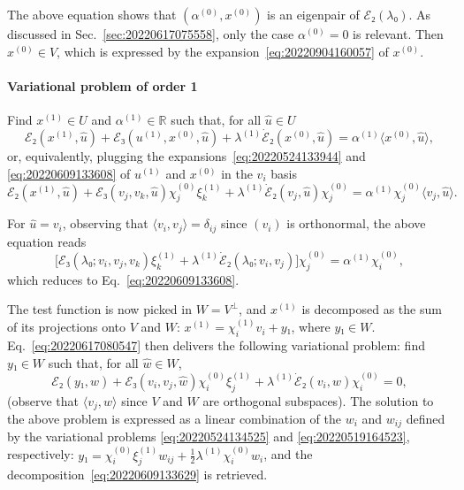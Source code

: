 \documentclass[12pt, final]{scrartcl}
\theoremstyle{definition}
\newcommand{\order}[2][1]{#2^{(#1)}}
\newcommand{\reals}{\mathbb{R}}
\begin{document}
The above equation shows that \((\order[0]α, \order[0]x)\) is an eigenpair of \(ℰ₂(λ₀)\). As
discussed in Sec.~\ref{sec:20220617075558}, only the case \(\order[0]α = 0\) is
relevant. Then \(\order[0]x ∈ V\), which is expressed by the
expansion~\eqref{eq:20220904160057} of \(\order[0]x\).

\paragraph{Variational problem of order 1} Find \(\order[1]x∈U\) and \(\order[1]α∈\reals\) such
that, for all \(\hat{u}∈U\)
\begin{equation}
  \label{eq:20220609131953}
  ℰ₂(\order[1]x, \hat{u}) + ℰ₃(\order[1]u, \order[0]x, \hat{u}) + \order[1]λ \dot{ℰ}₂(\order[0]x, \hat{u}) = \order[1]α 〈 \order[0]x, \hat{u} 〉,
\end{equation}
or, equivalently, plugging the expansions~\eqref{eq:20220524133944} and
\eqref{eq:20220609133608} of \(\order[1]u\) and \(\order[0]x\) in the \(v_i\) basis
\begin{equation}
  \label{eq:20220617080547}
  ℰ₂(\order[1]x, \hat{u}) + ℰ₃(v_j, v_k, \hat{u}) \order[0]{χ_j} \order[1]{ξ_k} + \order[1]λ \dot{ℰ}₂(v_j, \hat{u}) \order[0]{χ_j} = \order[1]α \order[0]{χ_j} 〈 v_j, \hat{u} 〉.
\end{equation}

For \(\hat{u} = v_i\), observing that \(〈 v_i, v_j 〉 = δ_{ij}\) since
\((v_i)\) is orthonormal, the above equation reads
\begin{equation}
  \bigl[ℰ₃(λ₀; v_i, v_j, v_k) \order[1]{ξ_k} + \order[1]λ \dot{ℰ}₂(λ₀; v_i, v_j)\bigr] \order[0]{χ_j} = \order[1]α \order[0]{χ_i},
\end{equation}
which reduces to Eq.~\eqref{eq:20220609133608}.

The test function is now picked in \(W = V^\perp\), and \(\order[1]x\) is decomposed as
the sum of its projections onto \(V\) and \(W\): \(\order[1]x = \order[1]{χ_i} v_i + y₁\), where
\(y₁ ∈ W\). Eq.~\eqref{eq:20220617080547} then delivers the following
variational problem: find \(y₁ ∈ W\) such that, for all \(\hat{w} ∈ W\),
\begin{equation}
  ℰ₂(y₁, \hat{w}) + ℰ₃(v_i, v_j, \hat{w}) \order[0]{χ_i} \order[1]{ξ_j} + \order[1]λ \dot{ℰ}₂(v_i, \hat{w}) \order[0]{χ_i} = 0,
\end{equation}
(observe that \(〈 v_j, \hat{w} 〉\) since \(V\) and \(W\) are orthogonal
subspaces). The solution to the above problem is expressed as a linear
combination of the \(w_i\) and \(w_{ij}\) defined by the variational problems
\eqref{eq:20220524134525} and \eqref{eq:20220519164523}, respectively:
\(y₁ = \order[0]{χ_i} \order[1]{ξ_j} w_{i j} + \tfrac{1}{2} \order[1]λ \order[0]{χ_i} w_i\), and the
decomposition~\eqref{eq:20220609133629} is retrieved.
\end{document}
